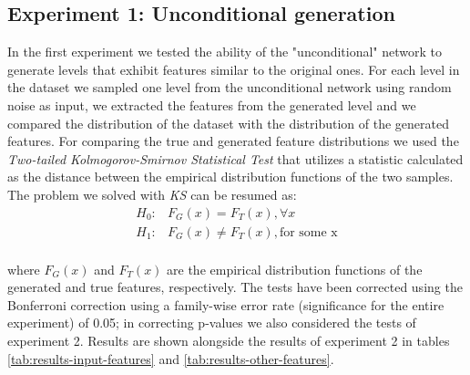 \subsection{Experiment 1: Unconditional generation}
In the first experiment we tested the ability of the "unconditional" network to generate levels that exhibit  features similar to the original ones. 
For each level in the dataset we sampled one level from the unconditional network using random noise as input, we extracted the features from the generated level and we compared the distribution of the dataset with the distribution of the generated features. For comparing the true and generated feature distributions we used the \textit{Two-tailed Kolmogorov-Smirnov Statistical Test} \cite{KS-test} that utilizes a statistic calculated as the distance  between the empirical distribution functions of the two samples. The problem we solved with \textit{KS} can be resumed as: \\

\begin{equation}
	\begin{split}
	H_{0}:  & F_{G}(x) = F_{T}(x), \forall x \\
	H_{1}:  & F_{G}(x) \neq F_{T}(x), \text{for some x} \\
	\end{split}
\end{equation}

where $F_{G}(x)$ and $F_{T}(x)$ are the empirical distribution functions of the generated and true features, respectively. The tests have been corrected using the Bonferroni correction using a family-wise error rate (significance for the entire experiment) of 0.05; in correcting p-values we also considered the tests of experiment 2. Results are shown alongside the results of experiment 2 in tables \ref{tab:results-input-features} and \ref{tab:results-other-features}.

